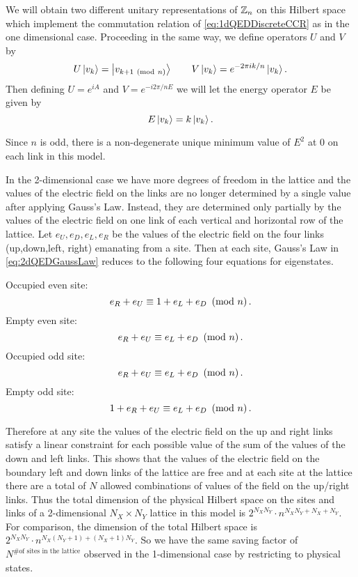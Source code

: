 \documentclass[11pt,reqno]{amsart}
\begin{document}
	We will obtain two different unitary representations of $\mathbb{Z}_n$ on this Hilbert space which implement the commutation relation of \cref{eq:1dQEDDiscreteCCR} as in the one dimensional case.
	Proceeding in the same way, we define operators $U$ and $V$ by
	\begin{equation}
		U\ket{v_k}=\ket{v_{k+1 \ \left(\mathrm{mod}\ n\right)}} \qquad V\ket{v_k}= e^{-2\pi i k/n} \ket{v_k}.
	\end{equation}
	Then defining $U=e^{iA}$ and $V=e^{-i2\pi/n E}$ we will let the energy operator $E$ be given by
	\begin{equation}
		E\ket{v_k}=k\ket{v_k}.
	\end{equation}
	
	Since $n$ is odd, there is a non-degenerate unique minimum value of $E^2$ at 0 on each link in this model.
	
	In the 2-dimensional case we have more degrees of freedom in the lattice and the values of the electric field on the links are no longer determined by a single value after applying Gauss's Law.
	Instead, they are determined only partially by the values of the electric field on one link of each vertical and horizontal row of the lattice. 
	Let $e_U,e_D,e_L,e_R$ be the values of the electric field on the four links (up,down,left, right) emanating from a site.
	Then at each site, Gauss's Law in \cref{eq:2dQEDGaussLaw} reduces to the following four equations for eigenstates.
	
	Occupied even site:
		\[ e_R+e_U \equiv 1+e_L+e_D \ \left(\mathrm{mod}\ n\right). \]
	Empty even site:
		\[ e_R+e_U \equiv e_L+e_D \ \left(\mathrm{mod}\ n\right). \]
	Occupied odd site:
		\[ e_R+e_U \equiv e_L+e_D \ \left(\mathrm{mod}\ n\right). \]
	Empty odd site:
		\[ 1+e_R+e_U \equiv e_L+e_D \ \left(\mathrm{mod}\ n\right). \]
	
	Therefore at any site the values of the electric field on the up and right links satisfy a linear constraint for each possible value of the sum of the values of the down and left links.
	This shows that the values of the electric field on the boundary left and down links of the lattice are free and at each site at the lattice there are a total of $N$ allowed combinations of values of the field on the up/right links.
	Thus the total dimension of the physical Hilbert space on the sites and links of a 2-dimensional $N_X\times N_Y$ lattice in this model is $2^{N_X N_Y} \cdot n^{N_X N_Y + N_X+ N_Y}$.
	For comparison, the dimension of the total Hilbert space is $2^{N_X N_Y} \cdot n^{N_X(N_Y+1)+(N_X+1)N_Y}$.
	So we have the same saving factor of $N^{\text{\# of sites in the lattice}}$ observed in the 1-dimensional case by restricting to physical states.\\
	
\end{document}
